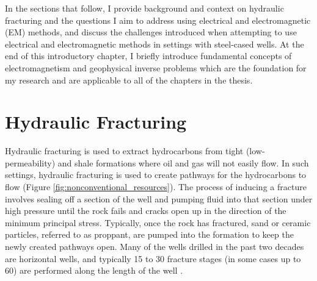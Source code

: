 In the sections that follow, I provide background and context on hydraulic fracturing and the questions I aim to address using electrical and electromagnetic (EM) methods, and discuss the challenges introduced when attempting to use electrical and electromagnetic methods in settings with steel-cased wells. At the end of this introductory chapter, I briefly introduce fundamental concepts of electromagnetism and geophysical inverse problems which are the foundation for my research and are applicable to all of the chapters in the thesis.

\section{Hydraulic Fracturing}
\label{sec:hydraulic-fracturing}

Hydraulic fracturing is used to extract hydrocarbons from tight (low-permeability) and shale formations where oil and gas will not easily flow. In such settings, hydraulic fracturing is used to create pathways for the hydrocarbons to flow (Figure \ref{fig:nonconventional_resources}). The process of inducing a fracture involves sealing off a section of the well and pumping fluid into that section under high pressure until the rock fails and cracks open up in the direction of the minimum principal stress. Typically, once the rock has fractured, sand or ceramic particles, referred to as proppant, are pumped into the formation to keep the newly created pathways open. Many of the wells drilled in the past two decades are horizontal wells, and typically 15 to 30 fracture stages (in some cases up to 60) are performed along the length of the well \citep{Maxwell2014}.

